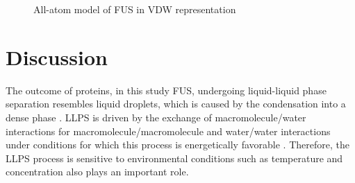 \documentclass[12ptr]{article}
\begin{document}
\begin{figure}[!ht]
    \centering
    \qquad
    \caption {\small All-atom model of FUS in VDW representation}
    \label{fig:fus_430}
\end{figure}
\newpage

\section{Discussion}
The outcome of proteins, in this study FUS, undergoing liquid-liquid phase separation resembles liquid droplets, which is caused by the condensation into a dense phase \cite{Alberti_19}. LLPS is driven by the exchange of macromolecule/water interactions for macromolecule/macromolecule and water/water interactions under conditions for which this process is energetically favorable \cite{Alberti_19}. Therefore, the LLPS process is sensitive to environmental conditions such as temperature and concentration also plays an important role. \\[0.01cm]
\end{document}

